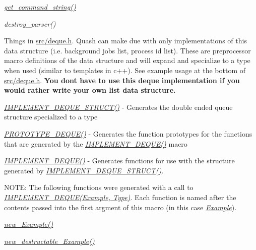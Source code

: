 \begin{DoxyItemize}
\item {\itshape \hyperlink{quash_8c_ab43880685b2507434e4a84f2cb9d54d4}{get\+\_\+command\+\_\+string()}} 
\item {\itshape destroy\+\_\+parser()} 
\item Things in \hyperlink{deque_8h}{src/deque.\+h}. Quash can make due with only implementations of this data structure (i.\+e. background jobs list, process id list). These are preprocessor macro definitions of the data structure and will expand and specialize to a type when used (similar to templates in c++). See example usage at the bottom of \hyperlink{deque_8h}{src/deque.\+h}. {\bfseries You don\textquotesingle{}t have to use this deque implementation if you would rather write your own list data structure.}
\begin{DoxyItemize}
\item {\itshape \hyperlink{deque_8h_a091cfc1289538b13036bcd36d12a3c01}{I\+M\+P\+L\+E\+M\+E\+N\+T\+\_\+\+D\+E\+Q\+U\+E\+\_\+\+S\+T\+R\+U\+C\+T()}} -\/ Generates the double ended queue structure specialized to a type
\item {\itshape \hyperlink{deque_8h_af9dc10c0d5c775afe3053629e39f8c36}{P\+R\+O\+T\+O\+T\+Y\+P\+E\+\_\+\+D\+E\+Q\+U\+E()}} -\/ Generates the function prototypes for the functions that are generated by the {\itshape \hyperlink{deque_8h_a71fbe309fa88eb8d294b141f33d81233}{I\+M\+P\+L\+E\+M\+E\+N\+T\+\_\+\+D\+E\+Q\+U\+E()}} macro
\item {\itshape \hyperlink{deque_8h_a71fbe309fa88eb8d294b141f33d81233}{I\+M\+P\+L\+E\+M\+E\+N\+T\+\_\+\+D\+E\+Q\+U\+E()}} -\/ Generates functions for use with the structure generated by {\itshape \hyperlink{deque_8h_a091cfc1289538b13036bcd36d12a3c01}{I\+M\+P\+L\+E\+M\+E\+N\+T\+\_\+\+D\+E\+Q\+U\+E\+\_\+\+S\+T\+R\+U\+C\+T()}}.
\begin{DoxyItemize}
\item N\+O\+TE\+: The following functions were generated with a call to {\itshape \hyperlink{deque_8h_a71fbe309fa88eb8d294b141f33d81233}{I\+M\+P\+L\+E\+M\+E\+N\+T\+\_\+\+D\+E\+Q\+U\+E(\+Example, Type)}}. Each function is named after the contents passed into the first argment of this macro (in this case {\itshape \hyperlink{structExample}{Example}}).
\item {\itshape \hyperlink{group__DEQUE_gae0c6f52c89e2b087e19e3062186144da}{new\+\_\+\+Example()}} 
\item {\itshape \hyperlink{group__DEQUE_ga4a210705b6f22fe97b7033bb8854a4d6}{new\+\_\+destructable\+\_\+\+Example()}} 

\end{DoxyItemize}
\end{DoxyItemize}
\end{DoxyItemize}
